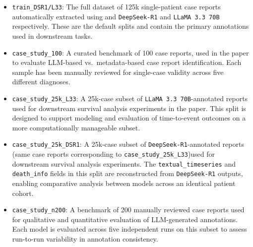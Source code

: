 \documentclass[pdflatex,sn-mathphys-num]{sn-jnl}%
\theoremstyle{thmstyleone}%
\theoremstyle{thmstyletwo}%
\theoremstyle{thmstylethree}%
\begin{document}


\begin{itemize}
    \item \texttt{train\_DSR1/L33}: The full dataset of 125k single-patient case reports automatically extracted using and \texttt{DeepSeek-R1} and \texttt{LLaMA 3.3 70B} respectively. These are the default splits and contain the primary annotations used in downstream tasks.
    
    \item \texttt{case\_study\_100}: A curated benchmark of 100 case reports, used in the paper to evaluate LLM-based vs.\ metadata-based case report identification. Each sample has been manually reviewed for single-case validity across five different diagnoses.
    
    \item \texttt{case\_study\_25k\_L33}: A 25k-case subset of \texttt{LLaMA 3.3 70B}-annotated reports used for downstream survival analysis experiments in the paper. This split is designed to support modeling and evaluation of time-to-event outcomes on a more computationally manageable subset.
    
    \item \texttt{case\_study\_25k\_DSR1}: A 25k-case subset of \texttt{DeepSeek-R1}-annotated reports (same case reports corresponding to \texttt{case\_study\_25k\_L33})used for downstream survival analysis experiments. The \texttt{textual\_timeseries} and \texttt{death\_info} fields in this split are reconstructed from \texttt{DeepSeek-R1} outputs, enabling comparative analysis between models across an identical patient cohort.
    
    \item \texttt{case\_study\_n200}: A benchmark of 200 manually reviewed case reports used for qualitative and quantitative evaluation of LLM-generated annotations. Each model is evaluated across five independent runs on this subset to assess run-to-run variability in annotation consistency.

\end{itemize}
\end{document}
